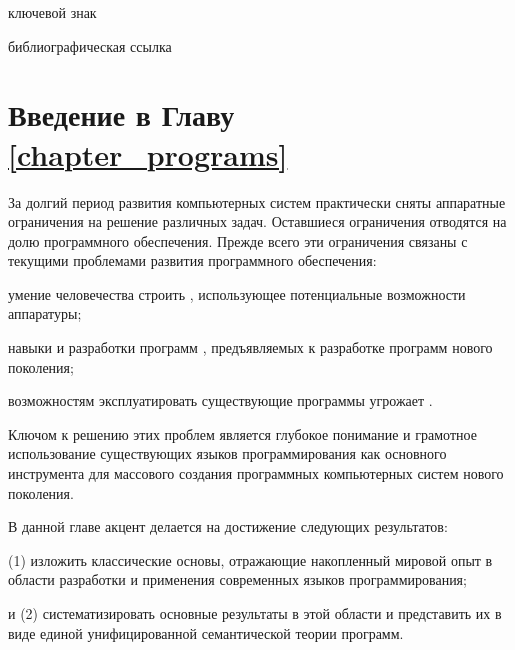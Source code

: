\begin{SCn}
\begin{scnrelfromlist}{ключевой знак}
\end{scnrelfromlist}

\bigskip

\begin{scnrelfromlist}{библиографическая ссылка}
	\scnitem{***}
\end{scnrelfromlist}

\end{SCn}

\section*{Введение в Главу \ref{chapter_programs}~}

За долгий период развития компьютерных систем практически сняты аппаратные ограничения на решение различных задач. Оставшиеся ограничения отводятся на долю программного обеспечения. Прежде всего эти ограничения связаны с текущими проблемами развития программного обеспечения:
\begin{textitemize}
    \item {} умение человечества строить , использующее потенциальные возможности аппаратуры;
    \item навыки и  разработки программ , предъявляемых к разработке программ нового поколения;
    \item возможностям эксплуатировать существующие программы угрожает .
\end{textitemize}

Ключом к решению этих проблем является глубокое понимание и грамотное использование существующих языков программирования как основного инструмента для массового создания программных компьютерных систем нового поколения.

В данной главе акцент делается на достижение следующих результатов:
\begin{textitemize}
    \item (1) изложить классические основы, отражающие накопленный мировой опыт в области разработки и применения современных языков программирования;
    \item и (2) систематизировать основные результаты в этой области и представить их в виде единой унифицированной семантической теории программ.
\end{textitemize}


